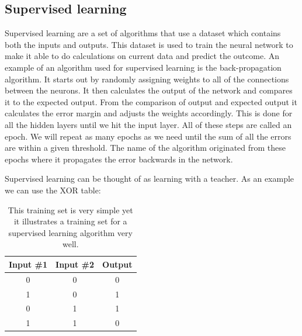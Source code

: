 \subsection{Supervised learning}
Supervised learning are a set of algorithms that use a dataset which contains both the inputs and outputs. This dataset is used to train the neural network to make it able to do calculations on current data and predict the outcome. An example of an algorithm used for supervised learning is the back-propagation algorithm. 
It starts out by randomly assigning weights to all of the connections between the neurons. It then calculates the output of the network and compares it to the expected output. From the comparison of output and expected output it calculates the error margin and adjusts the weights accordingly. This is done for all the hidden layers until we hit the input layer. All of these steps are called an epoch. We will repeat as many epochs as we need until the sum of all the errors are within a given threshold. The name of the algorithm originated from these epochs where it propagates the error backwards in the network.

Supervised learning can be thought of as learning with a teacher. As an example we can use the XOR table:

\begin{table}[!ht]
\centering  %
\begin{tabular}{c c c} %
Input \#1 & Input \#2 & Output \\ [0.5ex] %
\hline                  %
0 & 0 & 0  \\ %
1 & 0 & 1  \\
0 & 1 & 1  \\
1 & 1 & 0 \\ [1ex] %
\hline %
\end{tabular}
\caption{This training set is very simple yet it illustrates a training set for a supervised learning algorithm very well.} %
\label{table:xor-table} %
\end{table}

